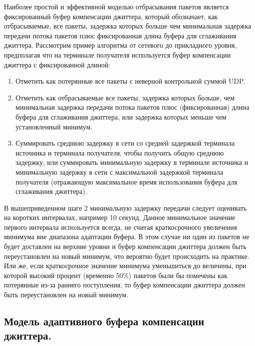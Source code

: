 Наиболее простой и эффективной моделью отбрасывания пакетов является фиксированный буфер компенсации джиттера, который обозначает, как отбрасываемые, все пакеты, задержка которых больше чем минимальная задержка передачи потока пакетов плюс фиксированная длина буфера для сглаживания джиттера.
Рассмотрим пример алгоритма от сетевого до прикладного уровня, предполагая что на терминале получателя используется буфер компенсации джиттера с фиксированной длиной:
\begin{enumerate}
\item Отметить как потерянные все пакеты с неверной контрольной суммой UDP.
\item Отметить как отбрасываемые все пакеты, задержка которых больше, чем минимальная задержка передачи потока пакетов плюс (фиксированная) длина буфера для сглаживания джиттера, или задержка которых меньше чем установленный минимум. 
\item Суммировать среднюю задержку в сети со средней задержкой терминала источника и терминала получателя, чтобы получить общую среднюю задержку, или суммировать минимальную задержку в терминале источника и минимальную задержку в сети с максимальной задержкой терминала получателя (отражающую максимальное время использования буфера для сглаживания джиттера).
\end{enumerate}

В вышеприведенном шаге 2 минимальную задержку передачи следует оценивать на коротких интервалах, например 10 секунд. Данное минимальное значение первого интервала используется всегда, не считая краткосрочного увеличения минимума вне диапазона адаптации буфера. В этом случае ни один из пакетов не будет доставлен на верхние уровни и буфер компенсации джиттера должен быть переустановлен на новый минимум, что вероятно будет происходить на практике. Или же, если краткосрочное значение минимума уменьшиться до величины, при которой высокий процент (временно 50\%) пакетов были бы помечены как потерянные из-за раннего поступления, то буфер компенсации джиттера должен быть переустановлен на новый минимум.

\subsection{Модель адаптивного буфера компенсации джиттера.} \label{sect3_4_2}

